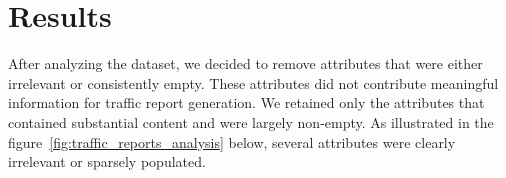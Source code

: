 \documentclass[fleqn,moreauthors,10pt]{ds_report}
\begin{document}







\section*{Results}

After analyzing the dataset, we decided to remove attributes that were either irrelevant or consistently empty. These attributes did not contribute meaningful information for traffic report generation. We retained only the attributes that contained substantial content and were largely non-empty. As illustrated in the figure~\ref{fig:traffic_reports_analysis} below, several attributes were clearly irrelevant or sparsely populated.
\end{document}
